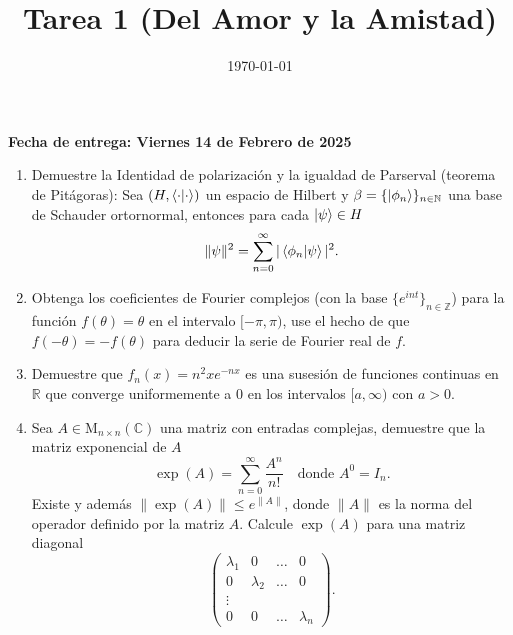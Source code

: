 \documentclass[letterpaper]{article}
\date{\today}
\title{Tarea 1 (Del Amor y la Amistad)}
\newcommand{\zah}{\ensuremath{ \mathbb Z }}
\newcommand{\nat}{\ensuremath{ \mathbb N }}
\newcommand{\co}{\ensuremath{\mathbb C }}
\newcommand{\re}{\ensuremath{\mathbb R }}
\begin{document}
\maketitle

\textbf{Fecha de entrega: Viernes 14 de Febrero de 2025}

\begin{enumerate}
\item Demuestre la Identidad de polarización y la igualdad de Parserval (teorema de Pitágoras):
Sea \((H,\braket{\cdot|\cdot})\) un espacio de Hilbert y \(\beta=\{\ket{\phi_n}\}_{n\in\nat}\) una base de Schauder ortornormal, entonces para cada \(\ket{\psi}\in H\)
\[
        \|\psi\|^2=\sum_{n=0}^{\infty}|\braket{\phi_n|\psi}|^2.
   \]
\item Obtenga los coeficientes de Fourier complejos (con la base \(\{e^{int}\}_{n\in\zah}\)) para la función \(f(\theta)=\theta\) en el intervalo \([-\pi,\pi)\), use el hecho de que \(f(-\theta)=-f(\theta)\) para deducir la serie de Fourier real de \(f\).
\item Demuestre que \(f_n(x)=n^2xe^{-nx}\) es una susesión de funciones continuas en \(\re\) que converge uniformemente a \(0\) en los intervalos \([a,\infty)\) con \(a>0\).
\item Sea \(A\in\textrm{M}_{n\times n}(\co)\) una matriz con entradas complejas, demuestre que la matriz exponencial de \(A\)
\[
        \exp(A)=\sum_{n=0}^{\infty}\frac{A^n}{n!}\quad\text{donde } A^0=I_n.
   \]
Existe y además \(\|\exp(A)\|\leq e^{\|A\|}\), donde \(\|A\|\) es la norma del operador definido por la matriz \(A\). Calcule \(\exp(A)\) para una matriz diagonal
\[
        \begin{pmatrix}\lambda_1 & 0 & \dots & 0\\
                       0 & \lambda_2 & \dots & 0\\
                                \vdots\\
                       0 & 0 & \dots & \lambda_n
        \end{pmatrix}.
   \]
\end{enumerate}
\end{document}
